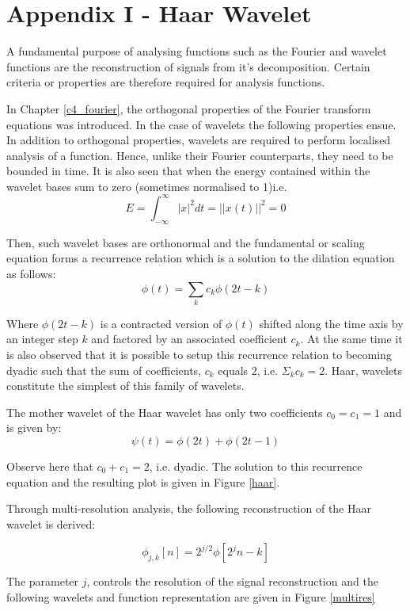 \section*{Appendix I - Haar Wavelet}

A fundamental purpose of analysing functions such as the Fourier and wavelet functions are the reconstruction of signals from it’s decomposition.  Certain criteria or properties are therefore required for analysis functions.  

In Chapter \ref{c4_fourier}, the orthogonal properties of the Fourier transform equations was introduced.  In the case of wavelets the following properties ensue.  In addition to orthogonal properties, wavelets are required to perform localised analysis of a function. Hence, unlike their Fourier counterparts, they need to be bounded in time.  It is also seen that when the energy contained within the wavelet bases sum to zero (sometimes normalised to 1)i.e.
\begin{equation}
    E=\int_{-\infty}^\infty |x|^2dt=||x(t)||^2=0
    \label{app1_01_pwr}
\end{equation}

Then, such wavelet bases are orthonormal and the fundamental or scaling equation forms a recurrence relation which is a solution to the dilation equation as follows:
\begin{equation}
    \phi(t)=\sum_kc_k\phi(2t-k)
    \label{app1_02_dilation}
\end{equation}

Where $\phi(2t-k)$ is a contracted version of $\phi(t)$ shifted along the time axis by an integer step $k$ and factored by an associated coefficient $c_k$.  At the same time it is also observed that it is possible to setup this recurrence relation to becoming dyadic such that the sum of coefficients, $c_k$ equals $2$, i.e. $\Sigma_kc_k=2$. Haar, wavelets constitute the simplest of this family of wavelets.

The mother wavelet of the Haar wavelet has only two coefficients $c_0=c_1=1$ and is given by:
\begin{equation}
    \psi(t)=\phi(2t)+\phi(2t-1)
    \label{app1_03_mwavlet}
\end{equation}

Observe here that $c_0+c_1=2$, i.e. dyadic.  The solution to this recurrence equation and the resulting plot is given in Figure \ref{haar}. 

Through multi-resolution analysis, the following reconstruction of the Haar wavelet is derived:

\begin{equation}
   \phi_{j,k}[n]=2^{j/2}\phi[2^jn-k]
    \label{app1_04_mres}
\end{equation}

The parameter $j$, controls the resolution of the signal reconstruction and the following wavelets and function representation are given in Figure \ref{multires}
